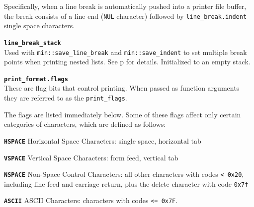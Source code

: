 \documentclass[12pt]{article}
\makeatletter
\newcommand{\TT}[1]{{\tt \bfseries #1}}
\newcommand{\ttmkey}[2]{\TT{#1}\index{#1@{\tt #1}!#2}}
\newcommand{\pagref}[1]{p\pageref{#1}}
\newcommand{\EOL}{\penalty \exhyphenpenalty}
\newenvironment{itemlist}[1][1.2in]%
	{\begin{list}{}{\setlength{\labelwidth}{#1}%
		        \setlength{\leftmargin}{\labelwidth}%
		        \addtolength{\leftmargin}{+0.2in}%
		        \renewcommand{\makelabel}[1]{##1\hfill}}}%
	{\end{list}}
\makeatother
\begin{document}
\begin{itemlist}[0.6in]
Specifically, when
a line break is automatically pushed into a printer file buffer, the
break consists of a line end ({\tt NUL} character) followed by
{\tt line\_\EOL break.indent} single space characters.

\item[\ttmkey{line\_\EOL break\_\EOL stack}{in {\tt min::printer}}]~\\
Used with {\tt min::\EOL save\_\EOL line\_\EOL break} and
{\tt min::\EOL save\_\EOL indent} to set
multiple break points when printing nested lists.
See \pagref{LINE-BREAK-STACK} for details.
Initialized to an empty stack.

\end{itemlist}

\begin{itemlist}[0.6in]

\item[\ttmkey{print\_format.flags}{in {\tt min::printer}}]%
\label{PRINT_FORMAT_FLAGS}~\\
These are flag bits that control printing.  When passed as
function arguments they are referred to as the
{\tt print\_\EOL flags}.

The flags are listed immediately below.
Some of these
flags affect only certain categories of characters, which are
defined as follows:

\begin{itemlist}[0.8in]
\item[\ttmkey{HSPACE}{character category}]
    Horizontal Space Characters: single space, horizontal tab
\item[\ttmkey{VSPACE}{character category}]
    Vertical Space Characters: form feed, vertical tab
\item[\ttmkey{NSPACE}{character category}]
    Non-Space Control Characters: all other characters
with codes {\tt <~0x20}, including line feed and carriage return,
plus the delete character with code {\tt 0x7f}
\item[\ttmkey{ASCII}{character category}] ASCII Characters: characters
with codes {\tt <= 0x7F}.
\end{itemlist}

\end{itemlist}
\end{document}
